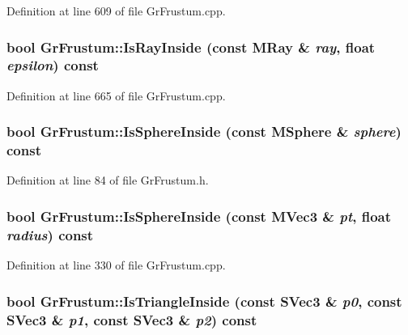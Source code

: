 \begin{CompactItemize}
Definition at line 609 of file GrFrustum.cpp.\hypertarget{class_gr_frustum_1b77aec57f30ea71c3f583f2724166b8}{
\subsubsection[{IsRayInside}]{\setlength{\rightskip}{0pt plus 5cm}bool GrFrustum::IsRayInside (const {\bf MRay} \& {\em ray}, \/  float {\em epsilon}) const}}
\label{class_gr_frustum_1b77aec57f30ea71c3f583f2724166b8}




Definition at line 665 of file GrFrustum.cpp.\hypertarget{class_gr_frustum_e5e75590acca54d5e79e27601d75fe12}{
\subsubsection[{IsSphereInside}]{\setlength{\rightskip}{0pt plus 5cm}bool GrFrustum::IsSphereInside (const {\bf MSphere} \& {\em sphere}) const}}
\label{class_gr_frustum_e5e75590acca54d5e79e27601d75fe12}




Definition at line 84 of file GrFrustum.h.\hypertarget{class_gr_frustum_602085817d3ab40d3aa10dc6e60e5295}{
\subsubsection[{IsSphereInside}]{\setlength{\rightskip}{0pt plus 5cm}bool GrFrustum::IsSphereInside (const {\bf MVec3} \& {\em pt}, \/  float {\em radius}) const}}
\label{class_gr_frustum_602085817d3ab40d3aa10dc6e60e5295}




Definition at line 330 of file GrFrustum.cpp.\hypertarget{class_gr_frustum_7bb6796010fb5e76de8f47850e0621da}{
\subsubsection[{IsTriangleInside}]{\setlength{\rightskip}{0pt plus 5cm}bool GrFrustum::IsTriangleInside (const {\bf SVec3} \& {\em p0}, \/  const {\bf SVec3} \& {\em p1}, \/  const {\bf SVec3} \& {\em p2}) const}}
\label{class_gr_frustum_7bb6796010fb5e76de8f47850e0621da}





\end{CompactItemize}
